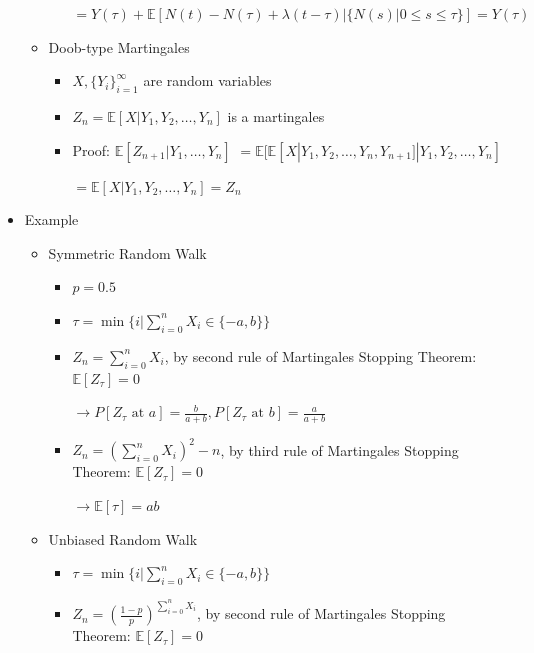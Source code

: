\documentclass[a4paper]{article}
\begin{document}
\begin{itemize}
\begin{itemize}
\begin{itemize}
                        $= Y(\tau) + \mathbb{E}[N(t) - N(\tau) + \lambda(t - \tau)| \{N(s) | 0 \leq s \leq \tau\}] = Y(\tau)$
                \end{itemize}
            \item Doob-type Martingales
                \begin{itemize}
                    \item $X, \{Y_i\}_{i=1}^\infty$ are random variables
                    \item $Z_n = \mathbb{E}[X|Y_1, Y_2, \dots, Y_n]$ is a martingales
                    \item Proof: $\mathbb{E}[Z_{n+1}| Y_1, \dots, Y_n]$
                        $= \mathbb{E}[\mathbb{E}[X|Y_1, Y_2, \dots, Y_n, Y_{n+1}]| Y_1, Y_2, \dots, Y_n]$

                        $= \mathbb{E}[X| Y_1, Y_2, \dots, Y_n] = Z_n$
                \end{itemize}
        \end{itemize}
    \item Example
        \begin{itemize}
            \item Symmetric Random Walk
                \begin{itemize}
                    \item $p = 0.5$
                    \item $\tau = \min\{i|\sum_{i=0}^n X_i \in \{-a, b\}\}$
                    \item $Z_n = \sum_{i=0}^n X_i$, by second rule of Martingales Stopping Theorem: $\mathbb{E}[Z_\tau] = 0$

                        $\rightarrow P[Z_\tau \text{ at }a ] = \frac{b}{a+b}, P[Z_\tau \text{ at }b ] = \frac{a}{a+b}$
                    \item $Z_n = (\sum_{i=0}^n X_i)^2 - n$, by third rule of Martingales Stopping Theorem: $\mathbb{E}[Z_\tau] = 0$

                        $\rightarrow \mathbb{E}[\tau] = ab$
                \end{itemize}
            \item Unbiased Random Walk
                \begin{itemize}
                    \item $\tau = \min\{i|\sum_{i=0}^n X_i \in \{-a, b\}\}$
                    \item $Z_n = (\frac{1-p}{p})^{\sum_{i=0}^n X_i}$, by second rule of Martingales Stopping Theorem: $\mathbb{E}[Z_\tau] = 0$


\end{itemize}
\end{itemize}
\end{itemize}
\end{document}
